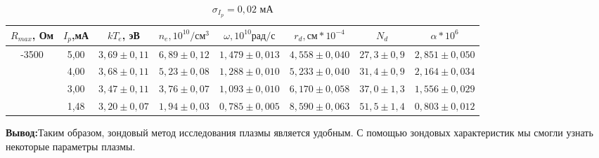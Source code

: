 \documentclass[a4paper]{article}
\begin{document}
\begin{table}[!h]
\begin{tabular}{|c|c|c|c|c|c|c|c|}
\hline
$R_{max}$, Ом             & $I_p$,мА & $kT_e$, эВ & $n_e, 10^{10}/\mbox{см}^3$ & $\omega, 10^{10} \mbox{рад}/\mbox{с}$ & $r_d, \mbox{см}*10^{-4}$ & $N_d$   & $\alpha*10^6$ \\ \hline
\multirow{4}{*}{-3500} & 5,00 & $3,69 \pm 0,11$   & $6,89 \pm 0,12$                                            & $1,479 \pm 0,013$                           & $4,558 \pm 0,040$        & $27,3 \pm 0,9$ & $2,851 \pm 0,050$                       \\ \cline{2-8} 
                       & 4,00 & $3,68 \pm 0,11$   & $5,23 \pm 0,08$                                            & $1,288 \pm 0,010$                          & $5,233 \pm 0,040$        & $31,4 \pm 0,9$ & $2,164 \pm 0,034$                      \\ \cline{2-8} 
                       & 3,00 & $3,47 \pm 0,11$  & $3,76 \pm 0,07$                                            & $1,093 \pm 0,010$                          & $6,170 \pm 0,058$         & $37,0 \pm 1,3$ & $1,556 \pm 0,029$                       \\ \cline{2-8} 
                       & 1,48 & $3,20 \pm 0,07$   & $1,94 \pm 0,03$                                            & $0,785 \pm 0,005$                           & $8,590 \pm 0,063$         & $51,5 \pm 1,4$ & $0,803 \pm 0,012$                       \\ \hline
\end{tabular}
\caption{$\sigma_{I_p} = 0,02$ мА}
\end{table}


\textbf{Вывод:}Таким образом, зондовый метод исследования плазмы является удобным. С помощью зондовых характеристик мы смогли узнать некоторые параметры плазмы.
\end{document}
